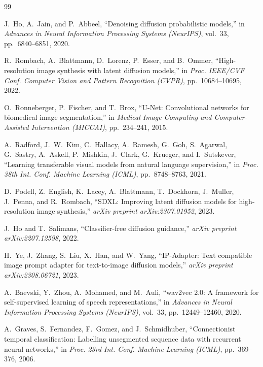 \documentclass[conference]{IEEEtran}
\begin{document}
\begin{thebibliography}{99}

J.~Ho, A.~Jain, and P.~Abbeel, ``Denoising diffusion probabilistic models,'' in \textit{Advances in Neural Information Processing Systems (NeurIPS)}, vol.~33, pp.~6840--6851, 2020.

R.~Rombach, A.~Blattmann, D.~Lorenz, P.~Esser, and B.~Ommer, ``High-resolution image synthesis with latent diffusion models,'' in \textit{Proc. IEEE/CVF Conf. Computer Vision and Pattern Recognition (CVPR)}, pp.~10684--10695, 2022.

O.~Ronneberger, P.~Fischer, and T.~Brox, ``U-Net: Convolutional networks for biomedical image segmentation,'' in \textit{Medical Image Computing and Computer-Assisted Intervention (MICCAI)}, pp.~234--241, 2015.

A.~Radford, J.~W.~Kim, C.~Hallacy, A.~Ramesh, G.~Goh, S.~Agarwal, G.~Sastry, A.~Askell, P.~Mishkin, J.~Clark, G.~Krueger, and I.~Sutskever, ``Learning transferable visual models from natural language supervision,'' in \textit{Proc. 38th Int. Conf. Machine Learning (ICML)}, pp.~8748--8763, 2021.

D.~Podell, Z.~English, K.~Lacey, A.~Blattmann, T.~Dockhorn, J.~Muller, J.~Penna, and R.~Rombach, ``SDXL: Improving latent diffusion models for high-resolution image synthesis,'' \textit{arXiv preprint arXiv:2307.01952}, 2023.

J.~Ho and T.~Salimans, ``Classifier-free diffusion guidance,'' \textit{arXiv preprint arXiv:2207.12598}, 2022.

H.~Ye, J.~Zhang, S.~Liu, X.~Han, and W.~Yang, ``IP-Adapter: Text compatible image prompt adapter for text-to-image diffusion models,'' \textit{arXiv preprint arXiv:2308.06721}, 2023.

A.~Baevski, Y.~Zhou, A.~Mohamed, and M.~Auli, ``wav2vec 2.0: A framework for self-supervised learning of speech representations,'' in \textit{Advances in Neural Information Processing Systems (NeurIPS)}, vol.~33, pp.~12449--12460, 2020.

A.~Graves, S.~Fernandez, F.~Gomez, and J.~Schmidhuber, ``Connectionist temporal classification: Labelling unsegmented sequence data with recurrent neural networks,'' in \textit{Proc. 23rd Int. Conf. Machine Learning (ICML)}, pp.~369--376, 2006.


\end{thebibliography}
\end{document}

